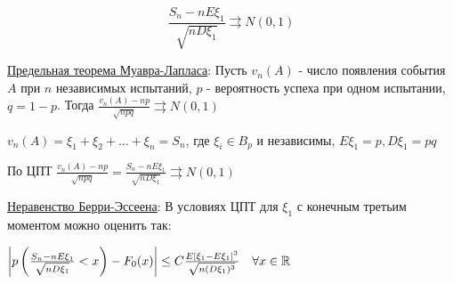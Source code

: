 \documentclass[12pt]{article}
\begin{document}
\begin{enumerate}
    \[\frac{S_n - nE\xi_1}{\sqrt{nD\xi_1}} \rightrightarrows N(0, 1)\]

    \hyperlink{limittheoremdemoivrelaplace}{Предельная теорема Муавра-Лапласа}: Пусть $v_n(A)$ - число появления события $A$ при $n$ независимых испытаний, $p$ - вероятность успеха при одном испытании, $q = 1 - p$.
    Тогда $\frac{v_n(A) - np}{\sqrt{npq}} \rightrightarrows N(0, 1)$

    \begin{MyProof}
        $v_n(A) = \xi_1 + \xi_2 + \dots + \xi_n = S_n$, где $\xi_i \in B_p$ и независимы, $E\xi_1 = p, D\xi_1 = pq$

        По ЦПТ $\frac{v_n(A) - np}{\sqrt{npq}} = \frac{S_n - nE\xi_1}{\sqrt{nD\xi_1}} \rightrightarrows N(0, 1)$
    \end{MyProof}

    \hyperlink{berryesseentheorem}{Неравенство Берри-Эссеена}: В условиях ЦПТ для $\xi_1$ с конечным третьим моментом можно оценить так:

    $\left|p\left(\frac{S_n - nE\xi_1}{\sqrt{nD\xi_1}} < x\right) - F_0(x)\right| \leq C\frac{E|\xi_1 - E\xi_1|^3}{\sqrt{n(D\xi_1)^3}} \quad \forall x \in \mathbb{R}$


\end{enumerate}
\end{document}

